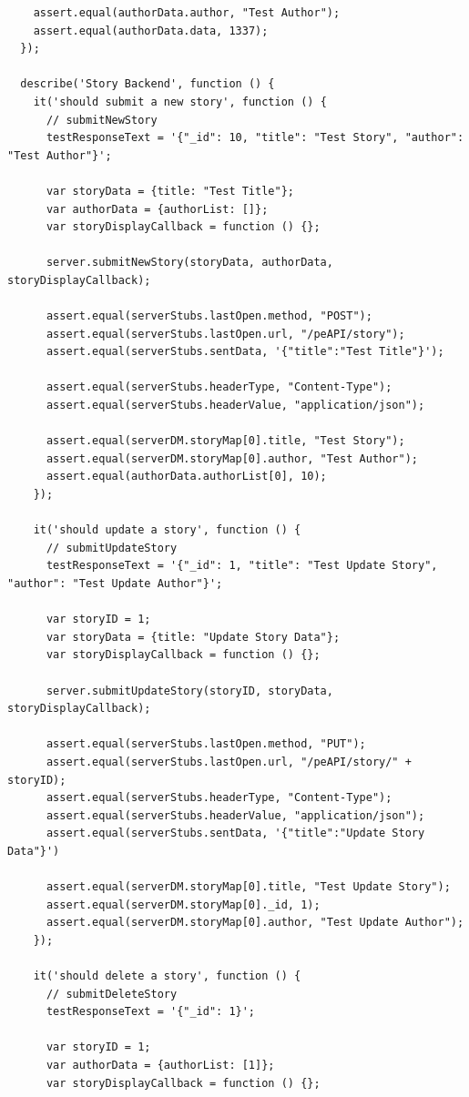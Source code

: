 \documentclass[12pt]{ucthesis}
\begin{document}
\begin{lstlisting}
    assert.equal(authorData.author, "Test Author");
    assert.equal(authorData.data, 1337);
  });

  describe('Story Backend', function () {
    it('should submit a new story', function () {
      // submitNewStory
      testResponseText = '{"_id": 10, "title": "Test Story", "author": "Test Author"}';

      var storyData = {title: "Test Title"};
      var authorData = {authorList: []};
      var storyDisplayCallback = function () {};

      server.submitNewStory(storyData, authorData, storyDisplayCallback);

      assert.equal(serverStubs.lastOpen.method, "POST");
      assert.equal(serverStubs.lastOpen.url, "/peAPI/story");
      assert.equal(serverStubs.sentData, '{"title":"Test Title"}');

      assert.equal(serverStubs.headerType, "Content-Type");
      assert.equal(serverStubs.headerValue, "application/json");

      assert.equal(serverDM.storyMap[0].title, "Test Story");
      assert.equal(serverDM.storyMap[0].author, "Test Author");
      assert.equal(authorData.authorList[0], 10);
    });

    it('should update a story', function () {
      // submitUpdateStory      
      testResponseText = '{"_id": 1, "title": "Test Update Story", "author": "Test Update Author"}';

      var storyID = 1;
      var storyData = {title: "Update Story Data"};
      var storyDisplayCallback = function () {};

      server.submitUpdateStory(storyID, storyData, storyDisplayCallback);

      assert.equal(serverStubs.lastOpen.method, "PUT");
      assert.equal(serverStubs.lastOpen.url, "/peAPI/story/" + storyID);
      assert.equal(serverStubs.headerType, "Content-Type");
      assert.equal(serverStubs.headerValue, "application/json");
      assert.equal(serverStubs.sentData, '{"title":"Update Story Data"}')

      assert.equal(serverDM.storyMap[0].title, "Test Update Story");
      assert.equal(serverDM.storyMap[0]._id, 1);
      assert.equal(serverDM.storyMap[0].author, "Test Update Author");
    });

    it('should delete a story', function () {
      // submitDeleteStory
      testResponseText = '{"_id": 1}';

      var storyID = 1;
      var authorData = {authorList: [1]};
      var storyDisplayCallback = function () {};


\end{lstlisting}
\end{document}
